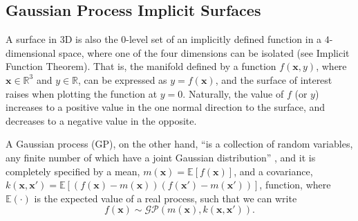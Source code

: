 \subsection{Gaussian Process Implicit Surfaces}
\label{sec:gpis}

A surface in 3D is also the $0$-level set of an implicitly defined function in a $4$-dimensional space, where one of the four dimensions can be isolated (see Implicit Function Theorem). 
 That is, the manifold defined by a function $f(\mathbf{x},y)$, where $\mathbf{x} \in \mathbb{R}^3$ and $y \in \mathbb{R}$, can be expressed as $y = f(\mathbf{x})$, and the surface of interest raises when plotting the function at $y = 0$. Naturally, the value of $f$ (or $y$) increases to a positive value in the one normal direction to the surface, and decreases to a negative value in the opposite.

A Gaussian process (GP), on the other hand, ``is a collection of random variables, any finite number of which have a joint Gaussian distribution'' \citep[Def. 2.1]{Rasmussen2006Gaussian}, and it is completely specified by a mean, $m(\mathbf{x}) = \mathbb{E}[f(\mathbf{x})]$, and a covariance, $k(\mathbf{x},\mathbf{x}') = \mathbb{E}[(f(\mathbf{x}) - m(\mathbf{x}))(f(\mathbf{x}') - m(\mathbf{x}'))]$, function, where $\mathbb{E}(\cdot)$ is the expected value of a real process, such that we can write
\begin{equation}
f(\mathbf{x}) \sim \mathcal{GP}(m(\mathbf{x}), k(\mathbf{x},\mathbf{x}')).
\end{equation}

